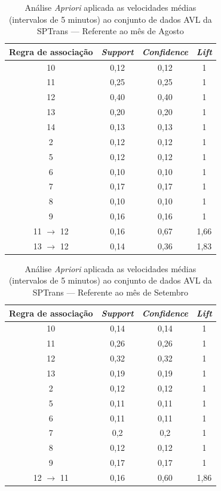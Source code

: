 \documentclass[
	12pt,				%
	oneside,			%
	a4paper,			%
	english,			%
	brazil				%
	]{abntex2ppgsi}
\begin{document}
{{{\begin{apendicesenv}
\begin{table}[!htb]
\centering
\caption {Análise \textit{Apriori} aplicada as velocidades médias (intervalos de 5 minutos) ao conjunto de dados AVL da SPTrans --- Referente ao mês de Agosto}
\label {tab:aprioriAugust}
\begin{tabular}{c|c|c|c}
\toprule
\textbf{Regra de associação} & \textit{\textbf{Support}} & \textit{\textbf{Confidence}} & \textit{\textbf{Lift}} \\
\midrule
10 &  0,12 &  0,12 &  1\\
\hline
11 &  0,25 &  0,25 &  1\\
\hline
12 &  0,40 &  0,40 &  1\\
\hline
13 &  0,20 &  0,20 &  1\\
\hline
14 &  0,13 &  0,13 &  1\\
\hline
2 &  0,12 &  0,12 &  1\\
\hline
5 &  0,12 &  0,12 &  1\\
\hline
6 &  0,10 &  0,10 &  1\\
\hline
7 &  0,17 &  0,17 &  1\\
\hline
8 &  0,10 &  0,10 &  1\\
\hline
9 &  0,16 &  0,16 &  1\\
\hline
11 $\rightarrow$ 12 &  0,16 &  0,67 &  1,66\\
\hline
13 $\rightarrow$ 12 &  0,14 &  0,36 &  1,83\\
\bottomrule
\end{tabular}
\end{table}

\begin{table}[!htb]
\centering
\caption {Análise \textit{Apriori} aplicada as velocidades médias (intervalos de 5 minutos) ao conjunto de dados AVL da SPTrans --- Referente ao mês de Setembro}
\label {tab:aprioriSeptember}
\begin{tabular}{c|c|c|c}
\toprule
\textbf{Regra de associação} & \textit{\textbf{Support}} & \textit{\textbf{Confidence}} & \textit{\textbf{Lift}} \\
\midrule
10 &  0,14 &  0,14 &  1\\
\hline
11 &  0,26 &  0,26 &  1\\
\hline
12 &  0,32 &  0,32 &  1\\
\hline
13 &  0,19 &  0,19 &  1\\
\hline
2 &  0,12 &  0,12 &  1\\
\hline
5 &  0,11 &  0,11 &  1\\
\hline
6 &  0,11 &  0,11 &  1\\
\hline
7 &  0,2 &  0,2 &  1\\
\hline
8 &  0,12 &  0,12 &  1\\
\hline
9 &  0,17 &  0,17 &  1\\
\hline
12 $\rightarrow$ 11 &  0,16 &  0,60 &  1,86\\
\bottomrule
\end{tabular}
\end{table}



\end{apendicesenv}}}}
\end{document}

